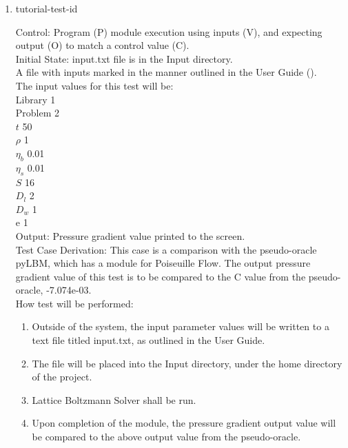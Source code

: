\documentclass[12pt, titlepage]{article}
\newcommand{\famname}{Lattice Boltzmann Solver}
\newcounter{testcounter} %
\begin{document}
\begin{enumerate}

\item{tutorial-test-id\thetestcounter \\}

Control: Program (P) module execution using inputs (V), and expecting output (O) to match a control value (C).\\
					
Initial State: input.txt file is in the Input directory.\\
					
A file with inputs marked in the manner outlined in the User
Guide (\citet{LBM_UserGuide_PM}).\\The input values for this test will be:\\
  Library 1\\
Problem 2\\
$t$ 50\\
$\rho$ 1\\
$\eta_b$ 0.01\\
$\eta_s$ 0.01\\
$S$ 16\\
$D_{l}$ 2\\
$D_{w}$ 1\\
$\mathrm{e}$ 1\\

					
Output: Pressure gradient value printed to the screen.  \\

Test Case Derivation: This case is a comparison with the pseudo-oracle pyLBM,
which has a module for Poiseuille Flow. The output pressure gradient value of
this test is to be compared to the C value from the pseudo-oracle,
-7.074e-03.\\
					
How test will be performed: 

\begin{enumerate}
\item Outside of the system, the input parameter values will be written to a text file titled input.txt, as outlined in the User Guide.
\item The file will be placed into the Input directory, under the home directory
of the project.
\item {\famname} shall be run.
\item Upon completion of the module, the pressure gradient output value will be
compared to the above output value from the pseudo-oracle.
\end{enumerate}			


\end{enumerate}
\end{document}
